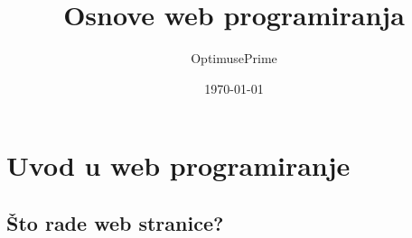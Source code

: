 \documentclass{report}
\title{\Huge{Osnove web programiranja}}
\author{\huge{OptimusePrime}}
\date{\today}
\begin{document}
    \maketitle
    \newpage%
    \tableofcontents
    \pagebreak

    \chapter{Uvod u web programiranje}
        \lipsum
        \section{Što rade web stranice?}
            \lipsum
\end{document}

